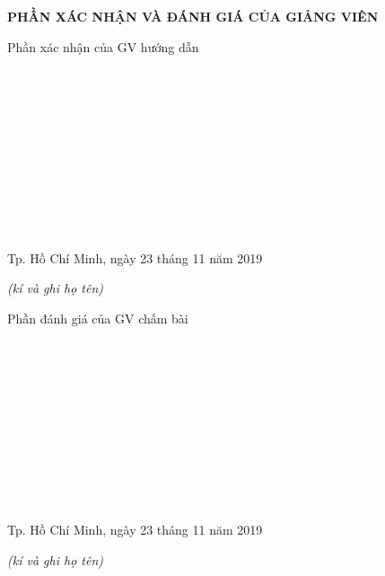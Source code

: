 
\newpage
\changefontsizes{16pt}
\centerline{\textbf{PHẦN XÁC NHẬN VÀ ĐÁNH GIÁ CỦA GIẢNG VIÊN}}
\bigskip
\changefontsizes{13pt}
\setlength{\parindent}{2.2cm}
Phần xác nhận của GV hướng dẫn

\vspace{0.8cm}
\setlength{\parindent}{1cm}
\ \xfill{1pt} \

\bigskip
\ \xfill{1pt} \

\bigskip
\ \xfill{1pt} \

\bigskip
\ \xfill{1pt} \

\bigskip
\ \xfill{1pt} \

\bigskip
\ \xfill{1pt} \

\changefontsizes{12pt}
\setlength{\parindent}{8cm}
Tp. Hồ Chí Minh, ngày 23 tháng 11 năm 2019

\setlength{\parindent}{11cm}
\textit{(kí và ghi họ tên)}

\changefontsizes{13pt}
\vspace{2.5cm}
\setlength{\parindent}{2.2cm}
Phần đánh giá của GV chấm bài

\vspace{0.8cm}
\setlength{\parindent}{1cm}
\ \xfill{1pt} \

\bigskip
\ \xfill{1pt} \

\bigskip
\ \xfill{1pt} \

\bigskip
\ \xfill{1pt} \

\bigskip
\ \xfill{1pt} \

\bigskip
\ \xfill{1pt} \

\changefontsizes{12pt}
\setlength{\parindent}{8cm}
Tp. Hồ Chí Minh, ngày 23 tháng 11 năm 2019

\setlength{\parindent}{11cm}
\textit{(kí và ghi họ tên)}
